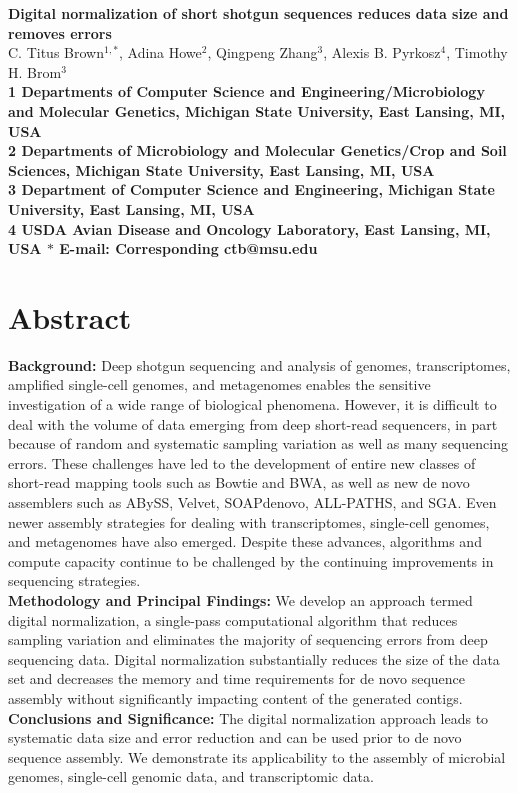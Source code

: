 \documentclass[10pt]{article}
\date{}
\begin{document}
\begin{flushleft}
{\Large
\textbf{Digital normalization of short shotgun sequences reduces data size
and removes errors}
}
\\
C. Titus Brown$^{1,\ast}$, 
Adina Howe$^{2}$,
Qingpeng Zhang$^{3}$,
Alexis B. Pyrkosz$^{4}$,
Timothy H. Brom$^{3}$
\\
\bf{1} Departments of Computer Science and Engineering/Microbiology and Molecular Genetics, Michigan State University, East Lansing, MI, USA
\\
\bf{2} Departments of Microbiology and Molecular Genetics/Crop and Soil Sciences, Michigan State University, East Lansing, MI, USA
\\
\bf{3} Department of Computer Science and Engineering, Michigan State University, East Lansing, MI, USA
\\
{\bf{4} USDA Avian Disease and Oncology Laboratory, East Lansing, MI, USA}
$\ast$ E-mail: Corresponding ctb@msu.edu
\end{flushleft}

\section*{Abstract}

{\bf Background:} Deep shotgun sequencing and analysis of genomes,
transcriptomes, amplified single-cell genomes, and metagenomes enables
the sensitive investigation of a wide range of biological
phenomena. However, it is difficult to deal with the volume of data
emerging from deep short-read sequencers, in part because of random
and systematic sampling variation as well as many sequencing errors.
These challenges have led to the development of entire new classes of
short-read mapping tools such as Bowtie and BWA, as well as new de
novo assemblers such as ABySS, Velvet, SOAPdenovo, ALL-PATHS, and SGA.
Even newer assembly strategies for dealing with transcriptomes,
single-cell genomes, and metagenomes have also emerged.  Despite these
advances, algorithms and compute capacity continue to be challenged by
the continuing improvements in sequencing strategies.
\\
{\bf Methodology and Principal Findings:} We develop an approach termed
digital normalization, a single-pass computational algorithm that
reduces sampling variation and eliminates the majority of sequencing
errors from deep sequencing data. Digital normalization substantially
reduces the size of the data set and decreases the memory and time
requirements for de novo sequence assembly without significantly
impacting content of the generated contigs.
\\
{\bf Conclusions and Significance:} The digital normalization approach leads
to systematic data size and error reduction and can be used prior to
de novo sequence assembly. We demonstrate its applicability to the
assembly of microbial genomes, single-cell genomic data, and
transcriptomic data.
\end{document}
